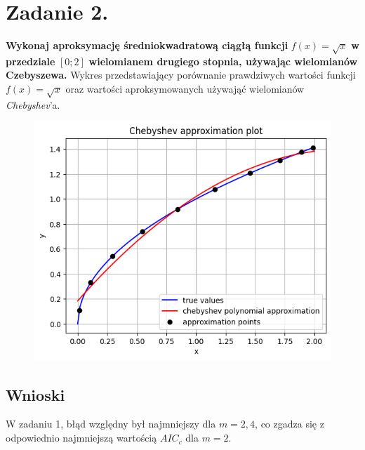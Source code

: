 \documentclass{article}
\begin{document}
\section*{Zadanie 2.}
\textbf{Wykonaj aproksymację średniokwadratową ciągłą funkcji}
$f(x) = \sqrt{x}$ \textbf{w przedziale} $[0;2]$ \textbf{wielomianem drugiego stopnia, używając wielomianów
Czebyszewa.}
\newpage
Wykres przedstawiający porównanie prawdziwych wartości funkcji 
$f(x) = \sqrt{x}$ oraz wartości aproksymowanych używająć wielomianów
\textit{Chebyshev}'a.
\begin{figure}[H]
  \includegraphics[width=\linewidth]{figures/chebyshev.png}
\end{figure}


\subsection*{Wnioski}
\null\quad W zadaniu 1, błąd względny był najmniejszy dla $m=2,4$, co
zgadza się z odpowiednio najmniejszą wartością $AIC_c$ dla $m=2$.
\end{document}
